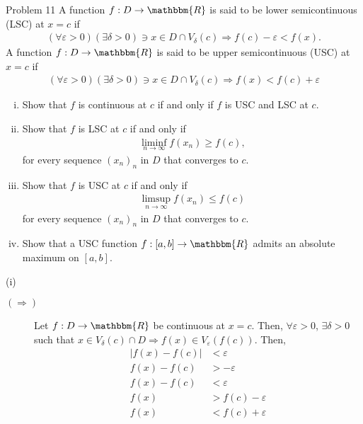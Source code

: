 \documentclass[8pt]{extarticle}
\newcommand{\R}{\mathbbm{R}}
\begin{document}
  \begin{problem}{Problem 11}
    A function $f: D\rightarrow \R$ is said to be lower semicontinuous (LSC) at $x=c$ if
    \begin{align*}
      (\forall \varepsilon > 0)(\exists \delta > 0) \ni x\in D\cap V_{\delta}(c) \Rightarrow f(c) - \varepsilon < f(x).
    \end{align*}
    A function $f: D\rightarrow \R$ is said to be upper semicontinuous (USC) at $x=c$ if
    \begin{align*}
      (\forall \varepsilon > 0)(\exists \delta > 0) \ni x\in D\cap V_{\delta}(c) \Rightarrow f(x) < f(c) + \varepsilon
    \end{align*}
    \begin{enumerate}[(i)]
      \item Show that $f$ is continuous at $c$ if and only if $f$ is USC and LSC at $c$.
      \item Show that $f$ is LSC at $c$ if and only if
        \begin{align*}
          \liminf_{n\rightarrow\infty}f(x_n) \geq f(c),
        \end{align*}
        for every sequence $(x_n)_n$ in $D$ that converges to $c$.
      \item Show that $f$ is USC at $c$ if and only if
        \begin{align*}
          \limsup_{n\rightarrow\infty}f(x_n) \leq f(c)
        \end{align*}
        for every sequence $(x_n)_n$ in $D$ that converges to $c$.
      \item Show that a USC function $f: [a,b]\rightarrow \R$ admits an absolute maximum on $[a,b]$.
    \end{enumerate}
    \tcblower
    \begin{problem}{(i)}
      \begin{description}
        \item[$(\Rightarrow)$] Let $f: D\rightarrow \R$ be continuous at $x=c$. Then, $\forall \varepsilon > 0$, $\exists \delta > 0$ such that $x\in V_{\delta}(c)\cap D \Rightarrow f(x)\in V_{\varepsilon}(f(c))$. Then,
          \begin{align*}
            |f(x) - f(c)| &< \varepsilon\\
            f(x) - f(c) &> -\varepsilon\\
            f(x) - f(c) &< \varepsilon\\
            f(x) &> f(c) - \varepsilon\\
            f(x) &< f(c) + \varepsilon

\end{align*}
\end{description}
\end{problem}
\end{problem}
\end{document}

